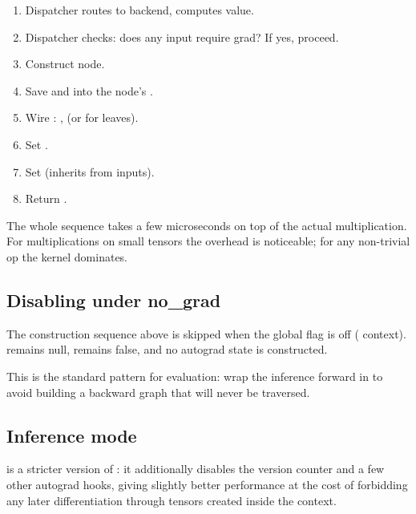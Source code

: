 \begin{enumerate}
  \item Dispatcher routes to backend, computes  value.
  \item Dispatcher checks: does any input require grad? If yes,
    proceed.
  \item Construct  node.
  \item Save  and  into the node's
    .
  \item Wire : ,  (or
     for leaves).
  \item Set .
  \item Set  (inherits from
    inputs).
  \item Return .
\end{enumerate}

The whole sequence takes a few microseconds on top of the actual
multiplication. For multiplications on small tensors the
overhead is noticeable; for any non-trivial op the kernel
dominates.

\subsection{Disabling under no\_grad}
\label{ssec:autograd_engine:no_grad}

The construction sequence above is skipped when the global
 flag is off ( context).
 remains null,  remains
false, and no autograd state is constructed.

This is the standard pattern for evaluation: wrap the inference
forward in  to avoid building a
backward graph that will never be traversed.

\subsection{Inference mode}
\label{ssec:autograd_engine:inference_mode}

 is a stricter version of
: it additionally disables the version counter
and a few other autograd hooks, giving slightly better
performance at the cost of forbidding any later differentiation
through tensors created inside the context.

